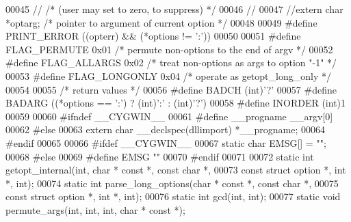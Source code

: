 \begin{DoxyCode}
00045 \textcolor{comment}{//              /* (user may set to zero, to suppress)    */}
00046 \textcolor{comment}{//}
00047 \textcolor{comment}{//extern char *optarg;      /* pointer to argument of current option  */}
00048 
00049 \textcolor{preprocessor}{#define PRINT\_ERROR ((opterr) && (*options != ':'))}
00050 
00051 \textcolor{preprocessor}{#define FLAG\_PERMUTE    0x01    }\textcolor{comment}{/* permute non-options to the end of argv */}\textcolor{preprocessor}{}
00052 \textcolor{preprocessor}{#define FLAG\_ALLARGS    0x02    }\textcolor{comment}{/* treat non-options as args to option "-1" */}\textcolor{preprocessor}{}
00053 \textcolor{preprocessor}{#define FLAG\_LONGONLY   0x04    }\textcolor{comment}{/* operate as getopt\_long\_only */}\textcolor{preprocessor}{}
00054 
00055 \textcolor{comment}{/* return values */}
00056 \textcolor{preprocessor}{#define BADCH       (int)'?'}
00057 \textcolor{preprocessor}{#define BADARG      ((*options == ':') ? (int)':' : (int)'?')}
00058 \textcolor{preprocessor}{#define INORDER     (int)1}
00059 
00060 \textcolor{preprocessor}{#ifndef \_\_CYGWIN\_\_}
00061 \textcolor{preprocessor}{#define \_\_progname \_\_argv[0]}
00062 \textcolor{preprocessor}{#else}
00063 \textcolor{keyword}{extern} \textcolor{keywordtype}{char} __declspec(dllimport) *__progname;
00064 \textcolor{preprocessor}{#endif}
00065 
00066 \textcolor{preprocessor}{#ifdef \_\_CYGWIN\_\_}
00067 \textcolor{keyword}{static} \textcolor{keywordtype}{char} EMSG[] = \textcolor{stringliteral}{""};
00068 \textcolor{preprocessor}{#else}
00069 \textcolor{preprocessor}{#define EMSG        ""}
00070 \textcolor{preprocessor}{#endif}
00071 
00072 \textcolor{keyword}{static} \textcolor{keywordtype}{int} getopt_internal(\textcolor{keywordtype}{int}, \textcolor{keywordtype}{char} * \textcolor{keyword}{const} *, \textcolor{keyword}{const} \textcolor{keywordtype}{char} *,
00073                \textcolor{keyword}{const} \textcolor{keyword}{struct} option *, \textcolor{keywordtype}{int} *, \textcolor{keywordtype}{int});
00074 \textcolor{keyword}{static} \textcolor{keywordtype}{int} parse_long_options(\textcolor{keywordtype}{char} * \textcolor{keyword}{const} *, \textcolor{keyword}{const} \textcolor{keywordtype}{char} *,
00075                   \textcolor{keyword}{const} \textcolor{keyword}{struct} option *, \textcolor{keywordtype}{int} *, \textcolor{keywordtype}{int});
00076 \textcolor{keyword}{static} \textcolor{keywordtype}{int} gcd(\textcolor{keywordtype}{int}, \textcolor{keywordtype}{int});
00077 \textcolor{keyword}{static} \textcolor{keywordtype}{void} permute_args(\textcolor{keywordtype}{int}, \textcolor{keywordtype}{int}, \textcolor{keywordtype}{int}, \textcolor{keywordtype}{char} * \textcolor{keyword}{const} *);

\end{DoxyCode}

